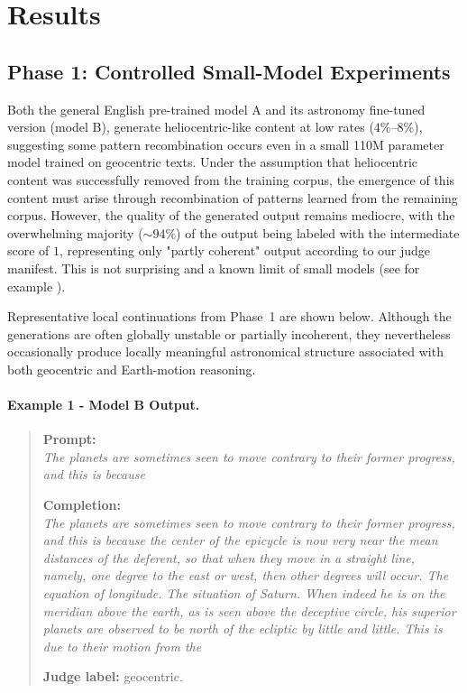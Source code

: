 \section{Results}

\subsection{Phase 1: Controlled Small-Model Experiments}
Both the general English pre-trained model A and its astronomy fine-tuned version (model B), generate heliocentric-like content at low rates ($4\%$--$8\%$), suggesting some pattern recombination occurs even in a small 110M parameter model trained on geocentric texts. Under the assumption that heliocentric content was successfully removed from the training corpus, the emergence of this content must arise through recombination of patterns learned from the remaining corpus. However, the quality of the generated output remains mediocre, with the overwhelming majority ($\sim 94\%$) of the output being labeled with the intermediate score of $1$, representing 
only "partly coherent" output according to our judge manifest. This is not surprising and a known limit of small models (see for example \cite{eldan2023tinystoriessmalllanguagemodels}).

Representative local continuations from Phase~1 are shown below. Although the generations are often globally unstable or partially incoherent, they nevertheless occasionally produce locally meaningful astronomical structure associated with both geocentric and Earth-motion reasoning.

\paragraph{Example 1 - Model B Output.}
\begin{quote}
\textbf{Prompt:} \\
\textit{The planets are sometimes seen to move contrary to their former progress, and this is because}

\vspace{0.5em}

\textbf{Completion:} \\
\textit{The planets are sometimes seen to move contrary to their former progress, and this is because the center of the epicycle is now very near the mean distances of the deferent, so that when they move in a straight line, namely, one degree to the east or west, then other degrees will occur. The equation of longitude. The situation of Saturn. When indeed he is on the meridian above the earth, as is seen above the deceptive circle, his superior planets are observed to be north of the ecliptic by little and little. This is due to their motion from the}

\vspace{0.5em}

\textbf{Judge label:} geocentric.
\end{quote}


